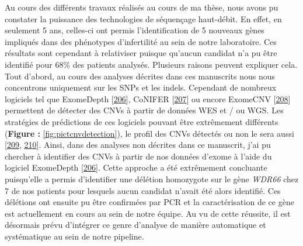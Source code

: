 \documentclass[12pt,a4paper,twoside]{ugathesis}
\theoremstyle{definition}
\theoremstyle{definition}
\theoremstyle{definition}
\theoremstyle{remark}
\begin{document}
Au cours des différents travaux réalisés au cours de ma thèse, nous
avons pu constater la puissance des technologies de séquençage
haut-débit. En effet, en seulement 5 ans, celles-ci ont permis
l'identification de 5 nouveaux gènes impliqués dans des phénotypes
d'infertilité au sein de notre laboratoire. Ces résultats sont cependant
à relativiser puisque qu'aucun candidat n'a pu être identifié pour 68\%
des patients analysés. Plusieurs raisons peuvent expliquer cela. Tout
d'abord, au cours des analyses décrites dans ces manuscrits nous nous
concentrons uniquement sur les SNPs et les indels. Cependant de nombreux
logiciels tel que ExomeDepth
{[}\protect\hyperlink{ref-Plagnol2012}{206}{]}, CoNIFER
{[}\protect\hyperlink{ref-Krumm2012}{207}{]} ou encore ExomeCNV
{[}\protect\hyperlink{ref-Sathirapongsasuti2011}{208}{]} permettent de
détecter des CNVs à partir de données WES et / ou WGS. Les stratégies de
prédictions de ces logiciels pouvant être extrêmement différents
(\textbf{Figure : }\ref{fig:pictcnvdetection}), le profil des CNVs
détectés ou non le sera aussi {[}\protect\hyperlink{ref-Zhao2013}{209},
\protect\hyperlink{ref-Guo2013}{210}{]}. Ainsi, dans des analyses non
décrites dans ce manuscrit, j'ai pu chercher à identifier des CNVs à
partir de nos données d'exome à l'aide du logiciel ExomeDepth
{[}\protect\hyperlink{ref-Plagnol2012}{206}{]}. Cette approche a été
extrêmement concluante puisqu'elle a permis d'identifier une délétion
homozygote sur le gène \emph{WDR66} chez 7 de nos patients pour lesquels
aucun candidat n'avait été alors identifié. Ces délétions ont ensuite pu
être confirmées par PCR et la caractérisation de ce gène est
actuellement en cours au sein de notre équipe. Au vu de cette réussite,
il est désormais prévu d'intégrer ce genre d'analyse de manière
automatique et systématique au sein de notre pipeline.
\end{document}
